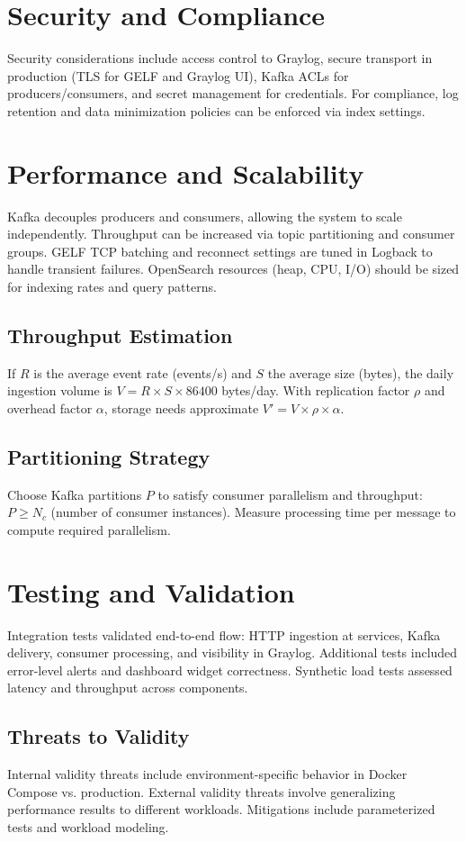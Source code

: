 \documentclass[12pt,a4paper]{report}
\begin{document}
\chapter{Security and Compliance}\label{chap:security}
Security considerations include access control to Graylog, secure transport in production (TLS for GELF and Graylog UI), Kafka ACLs for producers/consumers, and secret management for credentials. For compliance, log retention and data minimization policies can be enforced via index settings.

\chapter{Performance and Scalability}
Kafka decouples producers and consumers, allowing the system to scale independently. Throughput can be increased via topic partitioning and consumer groups. GELF TCP batching and reconnect settings are tuned in Logback to handle transient failures. OpenSearch resources (heap, CPU, I/O) should be sized for indexing rates and query patterns.

\section{Throughput Estimation}
If $R$ is the average event rate (events/s) and $S$ the average size (bytes), the daily ingestion volume is $V = R \times S \times 86400$ bytes/day. With replication factor $\rho$ and overhead factor $\alpha$, storage needs approximate $V' = V \times \rho \times \alpha$.

\section{Partitioning Strategy}
Choose Kafka partitions $P$ to satisfy consumer parallelism and throughput: $P \geq N_c$ (number of consumer instances). Measure processing time per message to compute required parallelism.

\chapter{Testing and Validation}
Integration tests validated end-to-end flow: HTTP ingestion at services, Kafka delivery, consumer processing, and visibility in Graylog. Additional tests included error-level alerts and dashboard widget correctness. Synthetic load tests assessed latency and throughput across components.

\section{Threats to Validity}
Internal validity threats include environment-specific behavior in Docker Compose vs. production. External validity threats involve generalizing performance results to different workloads. Mitigations include parameterized tests and workload modeling.
\end{document}
